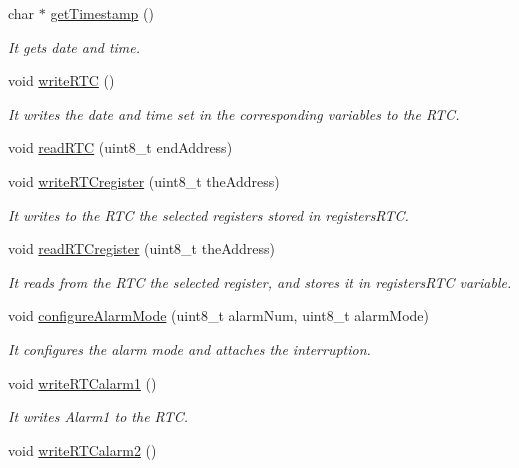 \begin{DoxyCompactItemize}
char $\ast$ \hyperlink{class_wasp_r_t_c_a34711fa7b3af46d78bda4542c84343d7}{get\+Timestamp} ()
\begin{DoxyCompactList}\small\item\em It gets date and time. \end{DoxyCompactList}\item 
void \hyperlink{class_wasp_r_t_c_a89edbeff8b1f54b4bf19606651d946de}{write\+R\+TC} ()
\begin{DoxyCompactList}\small\item\em It writes the date and time set in the corresponding variables to the R\+TC. \end{DoxyCompactList}\item 
void \hyperlink{class_wasp_r_t_c_a5e57fe11b7980ff3c2b14503a1255915}{read\+R\+TC} (uint8\+\_\+t end\+Address)
\item 
void \hyperlink{class_wasp_r_t_c_a7b6291e110c876a031ab4e110407514e}{write\+R\+T\+Cregister} (uint8\+\_\+t the\+Address)
\begin{DoxyCompactList}\small\item\em It writes to the R\+TC the selected registers stored in \textquotesingle{}registers\+R\+TC\textquotesingle{}. \end{DoxyCompactList}\item 
void \hyperlink{class_wasp_r_t_c_a17946ba1e6c84c822ffa8619ce1d02dd}{read\+R\+T\+Cregister} (uint8\+\_\+t the\+Address)
\begin{DoxyCompactList}\small\item\em It reads from the R\+TC the selected register, and stores it in \textquotesingle{}registers\+R\+TC\textquotesingle{} variable. \end{DoxyCompactList}\item 
void \hyperlink{class_wasp_r_t_c_ae2a1e1937063883d9d56c34758ce8f86}{configure\+Alarm\+Mode} (uint8\+\_\+t alarm\+Num, uint8\+\_\+t alarm\+Mode)
\begin{DoxyCompactList}\small\item\em It configures the alarm mode and attaches the interruption. \end{DoxyCompactList}\item 
void \hyperlink{class_wasp_r_t_c_a3254cf8ebea2137e3d2ea79b769616b6}{write\+R\+T\+Calarm1} ()
\begin{DoxyCompactList}\small\item\em It writes Alarm1 to the R\+TC. \end{DoxyCompactList}\item 
void \hyperlink{class_wasp_r_t_c_a13f247f7ecb79283c8e96115c76b8e23}{write\+R\+T\+Calarm2} ()

\end{DoxyCompactItemize}
